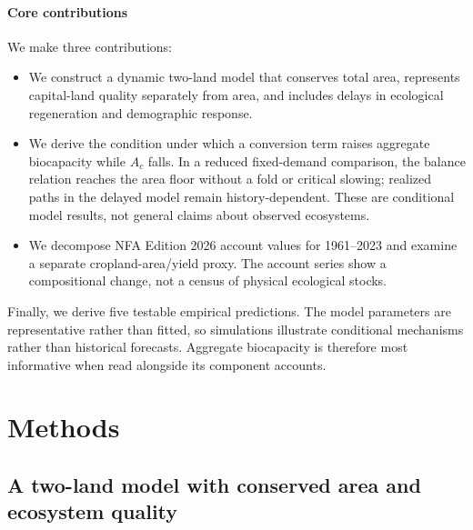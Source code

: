 \documentclass[preprint,12pt,authoryear]{elsarticle}
\begin{document}
\paragraph{Core contributions} We make three contributions:
\begin{itemize}
  \item We construct a dynamic two-land model that conserves total area, represents capital-land quality separately from area, and includes delays in ecological regeneration and demographic response.
  \item We derive the condition under which a conversion term raises aggregate biocapacity while $A_c$ falls. In a reduced fixed-demand comparison, the balance relation reaches the area floor without a fold or critical slowing; realized paths in the delayed model remain history-dependent. These are conditional model results, not general claims about observed ecosystems.
  \item We decompose NFA Edition 2026 account values for 1961--2023 and examine a separate cropland-area/yield proxy. The account series show a compositional change, not a census of physical ecological stocks.
\end{itemize}

Finally, we derive five testable empirical predictions. The model parameters are representative rather than fitted, so simulations illustrate conditional mechanisms rather than historical forecasts. Aggregate biocapacity is therefore most informative when read alongside its component accounts.

\section{Methods}\label{sec:model}

\subsection{A two-land model with conserved area and ecosystem quality}\label{sec:equations}
\end{document}
